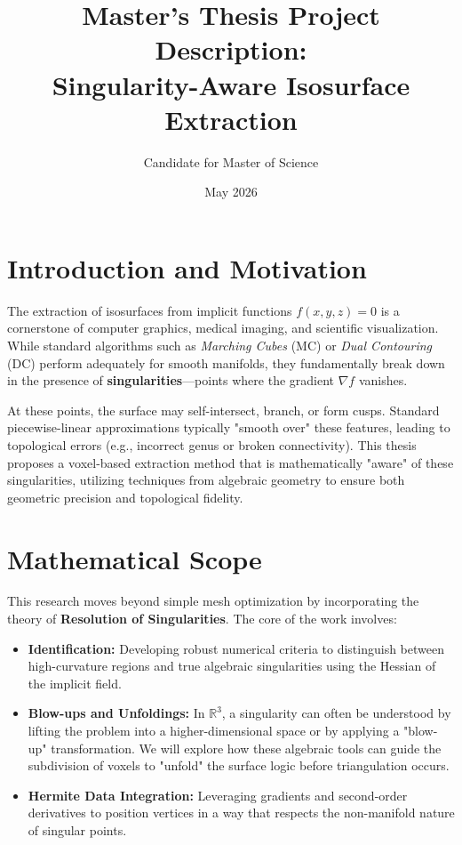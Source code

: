 \documentclass[12pt,a4paper]{article}
\title{\textbf{Master's Thesis Project Description:}\\ Singularity-Aware Isosurface Extraction}
\author{Candidate for Master of Science}
\date{May 2026}
\begin{document}
\maketitle

\section{Introduction and Motivation}
The extraction of isosurfaces from implicit functions $f(x, y, z) = 0$ is a cornerstone of computer graphics, medical imaging, and scientific visualization. While standard algorithms such as \textit{Marching Cubes} (MC) or \textit{Dual Contouring} (DC) perform adequately for smooth manifolds, they fundamentally break down in the presence of \textbf{singularities}—points where the gradient $\nabla f$ vanishes. 

At these points, the surface may self-intersect, branch, or form cusps. Standard piecewise-linear approximations typically "smooth over" these features, leading to topological errors (e.g., incorrect genus or broken connectivity). This thesis proposes a voxel-based extraction method that is mathematically "aware" of these singularities, utilizing techniques from algebraic geometry to ensure both geometric precision and topological fidelity.

\section{Mathematical Scope}
This research moves beyond simple mesh optimization by incorporating the theory of \textbf{Resolution of Singularities}. The core of the work involves:

\begin{itemize}
    \item \textbf{Identification:} Developing robust numerical criteria to distinguish between high-curvature regions and true algebraic singularities using the Hessian of the implicit field.
    \item \textbf{Blow-ups and Unfoldings:} In $\mathbb{R}^3$, a singularity can often be understood by lifting the problem into a higher-dimensional space or by applying a "blow-up" transformation. We will explore how these algebraic tools can guide the subdivision of voxels to "unfold" the surface logic before triangulation occurs.
    \item \textbf{Hermite Data Integration:} Leveraging gradients and second-order derivatives to position vertices in a way that respects the non-manifold nature of singular points.
\end{itemize}
\end{document}
